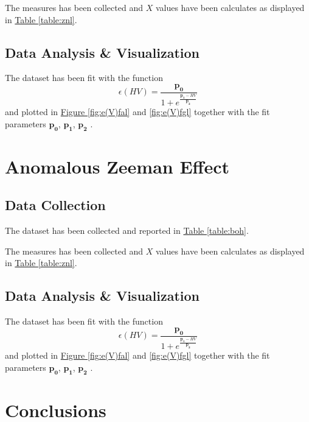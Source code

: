\documentclass[a4paper,12pt,abstracton]{scrartcl}
\begin{document}
The measures has been collected and $X$ values have been calculates as displayed in \hyperref[table:znl]{Table \ref*{table:znl}}.

\subsection{Data Analysis \& Visualization}
The dataset has been fit with the function $$\epsilon(HV)=\frac{\boldsymbol{p_0}}{1+e^{\frac{\boldsymbol{p_1}-HV}{\boldsymbol{p_2}}}}$$
and plotted in \hyperref[fig:e(V)fal]{Figure \ref*{fig:e(V)fal}} and \hyperref[fig:e(V)fgl]{ \ref*{fig:e(V)fgl}}  together with the fit parameters $\boldsymbol{p_0}$, $\boldsymbol{p_1}$, $\boldsymbol{p_2}$ .
\section{Anomalous Zeeman Effect}


\subsection{Data Collection}
The dataset has been collected and reported in \hyperref[table:boh]{Table \ref*{table:boh}}. \newline 

The measures has been collected and $X$ values have been calculates as displayed in \hyperref[table:znl]{Table \ref*{table:znl}}.

\subsection{Data Analysis \& Visualization}
The dataset has been fit with the function $$\epsilon(HV)=\frac{\boldsymbol{p_0}}{1+e^{\frac{\boldsymbol{p_1}-HV}{\boldsymbol{p_2}}}}$$
and plotted in \hyperref[fig:e(V)fal]{Figure \ref*{fig:e(V)fal}} and \hyperref[fig:e(V)fgl]{ \ref*{fig:e(V)fgl}}  together with the fit parameters $\boldsymbol{p_0}$, $\boldsymbol{p_1}$, $\boldsymbol{p_2}$ .

\section{Conclusions}


%
%
\end{document}
